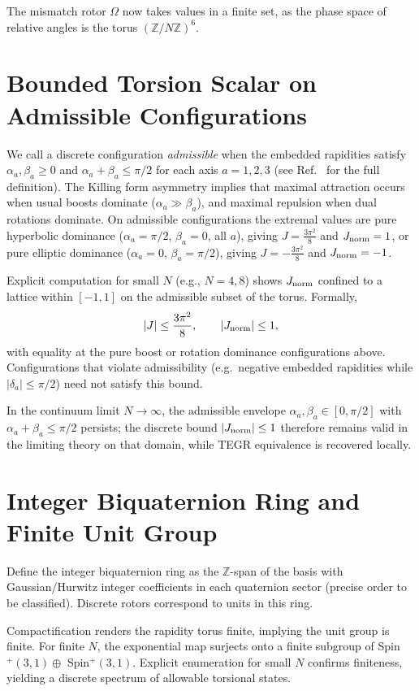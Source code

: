 \documentclass[dvipdfmx,11pt,a4paper]{article}
\newcommand{\Jnorm}{J_{\rm norm}}
\newcommand{\Jbound}{\frac{3\pi^2}{8}}
\begin{document}
The mismatch rotor $\Omega$ now takes values in a finite set, as the phase space of relative angles is the torus $(\mathbb{Z}/N\mathbb{Z})^6$.

\section{Bounded Torsion Scalar on Admissible Configurations}
\label{sec:bounded}

We call a discrete configuration \emph{admissible} when the embedded rapidities satisfy $\alpha_a,\beta_a\geq 0$ and $\alpha_a+\beta_a\leq\pi/2$ for each axis $a=1,2,3$ (see Ref.~\cite{diophantine-paper} for the full definition). The Killing form asymmetry implies that maximal attraction occurs when usual boosts dominate ($\alpha_a \gg \beta_a$), and maximal repulsion when dual rotations dominate. On admissible configurations the extremal values are pure hyperbolic dominance ($\alpha_a=\pi/2$, $\beta_a=0$, all $a$), giving $J=\Jbound$ and $\Jnorm=1$, or pure elliptic dominance ($\alpha_a=0$, $\beta_a=\pi/2$), giving $J=-\Jbound$ and $\Jnorm=-1$.

Explicit computation for small $N$ (e.g., $N=4,8$) shows $\Jnorm$ confined to a lattice within $[-1,1]$ on the admissible subset of the torus. Formally,
\[
|J| \leq \Jbound, \qquad |\Jnorm| \leq 1,
\]
with equality at the pure boost or rotation dominance configurations above. Configurations that violate admissibility (e.g.\ negative embedded rapidities while $|\delta_a|\leq\pi/2$) need not satisfy this bound.

In the continuum limit $N \to \infty$, the admissible envelope $\alpha_a,\beta_a\in[0,\pi/2]$ with $\alpha_a+\beta_a\leq\pi/2$ persists; the discrete bound $|\Jnorm|\leq 1$ therefore remains valid in the limiting theory on that domain, while TEGR equivalence is recovered locally.

\section{Integer Biquaternion Ring and Finite Unit Group}
\label{sec:integer}

Define the integer biquaternion ring as the $\mathbb{Z}$-span of the basis with Gaussian/Hurwitz integer coefficients in each quaternion sector (precise order to be classified). Discrete rotors correspond to units in this ring.

Compactification renders the rapidity torus finite, implying the unit group is finite. For finite $N$, the exponential map surjects onto a finite subgroup of Spin$^+(3,1) \oplus$ Spin$^+(3,1)$. Explicit enumeration for small $N$ confirms finiteness, yielding a discrete spectrum of allowable torsional states.
\end{document}
